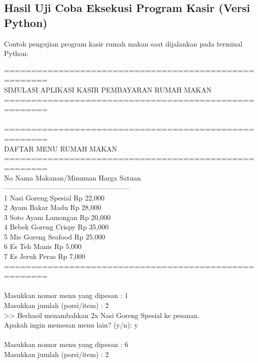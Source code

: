 \documentclass[12pt,a4paper]{article}
\begin{document}
\subsection{Hasil Uji Coba Eksekusi Program Kasir (Versi Python)}
Contoh pengujian program kasir rumah makan saat dijalankan pada terminal Python:
\begin{tcolorbox}[colback=black!90!white,coltext=green!90!white,fontupper=\ttfamily\footnotesize,title=\textbf{Terminal Output: Eksekusi Python Kasir Rumah Makan}]
======================================================\\
     SIMULASI APLIKASI KASIR PEMBAYARAN RUMAH MAKAN   \\
======================================================\\
\\
======================================================\\
               DAFTAR MENU RUMAH MAKAN               \\
======================================================\\
No    Nama Makanan/Minuman            Harga Satuan\\
------------------------------------------------------\\
1     Nasi Goreng Spesial                 Rp 22,000\\
2     Ayam Bakar Madu                     Rp 28,000\\
3     Soto Ayam Lamongan                  Rp 20,000\\
4     Bebek Goreng Crispy                 Rp 35,000\\
5     Mie Goreng Seafood                  Rp 25,000\\
6     Es Teh Manis                        Rp  5,000\\
7     Es Jeruk Peras                      Rp  7,000\\
======================================================\\
\\
Masukkan nomor menu yang dipesan : 1\\
Masukkan jumlah (porsi/item)    : 2\\
>> Berhasil menambahkan 2x Nasi Goreng Spesial ke pesanan.\\
Apakah ingin memesan menu lain? (y/n): y\\
\\
Masukkan nomor menu yang dipesan : 6\\
Masukkan jumlah (porsi/item)    : 2\\

\end{tcolorbox}
\end{document}
